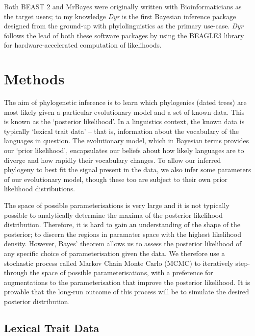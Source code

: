 \documentclass[10pt,journal,compsoc]{IEEEtran}
\begin{document}
Both BEAST 2 and MrBayes were originally written with Bioinformaticians as the target users; to my knowledge \textit{Dyr} is the first Bayesian inference package designed from the ground-up with phylolinguistics as the primary use-case. \textit{Dyr} follows the lead of both these software packages by using the BEAGLE3 library for hardware-accelerated computation of likelihoods.\cite{ayres2019beagle}

\section{Methods}

The aim of phylogenetic inference is to learn which phylogenies (dated trees) are most likely given a particular evolutionary model and a set of known data. This is known as the `posterior likelihood'. In a linguistics context, the known data is typically `lexical trait data' -- that is, information about the vocabulary of the languages in question. The evolutionary model, which in Bayesian terms provides our `prior likelihood', encapsulates our beliefs about how likely languages are to diverge and how rapidly their vocabulary changes. To allow our inferred phylogeny to best fit the signal present in the data, we also infer some parameters of our evolutionary model, though these too are subject to their own prior likelihood distributions.

The space of possible parameterisations is very large and it is not typically possible to analytically determine the maxima of the posterior likelihood distribution. Therefore, it is hard to gain an understanding of the shape of the posterior; to discern the regions in paramater space with the highest likelihood density. However, Bayes' theorem allows us to assess the posterior likelihood of any specific choice of parameterisation given the data. We therefore use a stochastic process called Markov Chain Monte Carlo (MCMC) to iteratively step-through the space of possible parameterisations, with a preference for augmentations to the parameterisation that improve the posterior likelihood. It is provable that the long-run outcome of this process will be to  simulate the desired posterior distribution.

\subsection{Lexical Trait Data}
\end{document}
